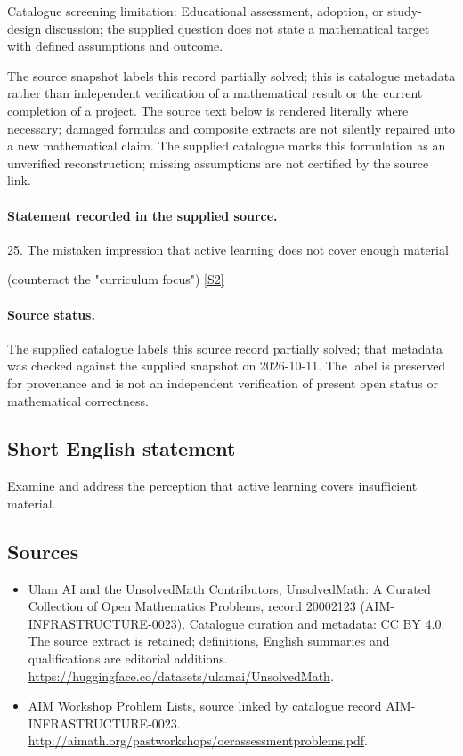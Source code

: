 \documentclass[11pt]{article}
\begin{document}
Catalogue screening limitation: Educational assessment, adoption, or study-design discussion; the supplied question does not state a mathematical target with defined assumptions and outcome.

The source snapshot labels this record partially solved; this is catalogue metadata rather than independent verification of a mathematical result or the current completion of a project.
The source text below is rendered literally where necessary; damaged formulas and composite extracts are not silently repaired into a new mathematical claim.
The supplied catalogue marks this formulation as an unverified reconstruction; missing assumptions are not certified by the source link.
\paragraph{Statement recorded in the supplied source.}
25. The mistaken impression that active learning does not cover enough material

(counteract the "curriculum focus") \href{http://aimath.org/pastworkshops/oerassessmentproblems.pdf}{[S2]}
\paragraph{Source status.}
The supplied catalogue labels this source record partially solved; that metadata was checked against the supplied snapshot on 2026-10-11. The label is preserved for provenance and is not an independent verification of present open status or mathematical correctness.
\subsection{Short English statement}
Examine and address the perception that active learning covers insufficient material.
\subsection{Sources}
\begin{itemize}
\item[S1] Ulam AI and the UnsolvedMath Contributors, UnsolvedMath: A Curated Collection of Open Mathematics Problems, record 20002123 (AIM-INFRASTRUCTURE-0023). Catalogue curation and metadata: CC BY 4.0. The source extract is retained; definitions, English summaries and qualifications are editorial additions.
\url{https://huggingface.co/datasets/ulamai/UnsolvedMath}.
\item[S2] AIM Workshop Problem Lists, source linked by catalogue record AIM-INFRASTRUCTURE-0023.
\url{http://aimath.org/pastworkshops/oerassessmentproblems.pdf}.
\end{itemize}
\end{document}
